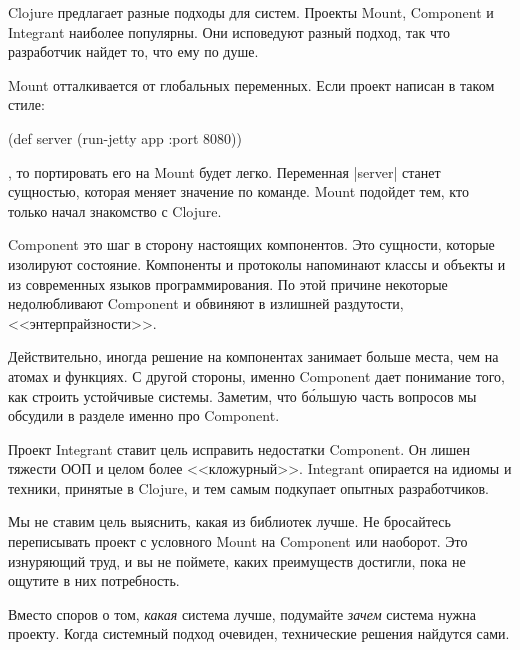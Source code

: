 Clojure предлагает разные подходы для систем. Проекты Mount, Component и
Integrant наиболее популярны. Они исповедуют разный подход, так что разработчик
найдет то, что ему по душе.

Mount отталкивается от глобальных переменных. Если проект написан в таком стиле:

\begin{english}
  \begin{clojure}
(def server (run-jetty app {:port 8080}))
  \end{clojure}
\end{english}

\noindent
, то портировать его на Mount будет легко. Переменная \spverb|server| станет
сущностью, которая меняет значение по команде. Mount подойдет тем, кто только
начал знакомство с Clojure.

Component это шаг в сторону настоящих компонентов. Это сущности, которые
изолируют состояние. Компоненты и протоколы напоминают классы и объекты и из
современных языков программирования. По этой причине некоторые недолюбливают
Component и обвиняют в излишней раздутости, <<энтерпрайзности>>.

Действительно, иногда решение на компонентах занимает больше места, чем на
атомах и функциях. С другой стороны, именно Component дает понимание того, как
строить устойчивые системы. Заметим, что б\'{о}льшую часть вопросов мы обсудили
в разделе именно про Component.

Проект Integrant ставит цель исправить недостатки Component. Он лишен тяжести
ООП и целом более <<кложурный>>. Integrant опирается на идиомы и техники,
принятые в Clojure, и тем самым подкупает опытных разработчиков.

Мы не ставим цель выяснить, какая из библиотек лучше. Не бросайтесь переписывать
проект с условного Mount на Component или наоборот. Это изнуряющий труд, и вы не
поймете, каких преимуществ достигли, пока не ощутите в них потребность.

Вместо споров о том, \emph{какая} система лучше, подумайте \emph{зачем} система
нужна проекту. Когда системный подход очевиден, технические решения найдутся
сами.
